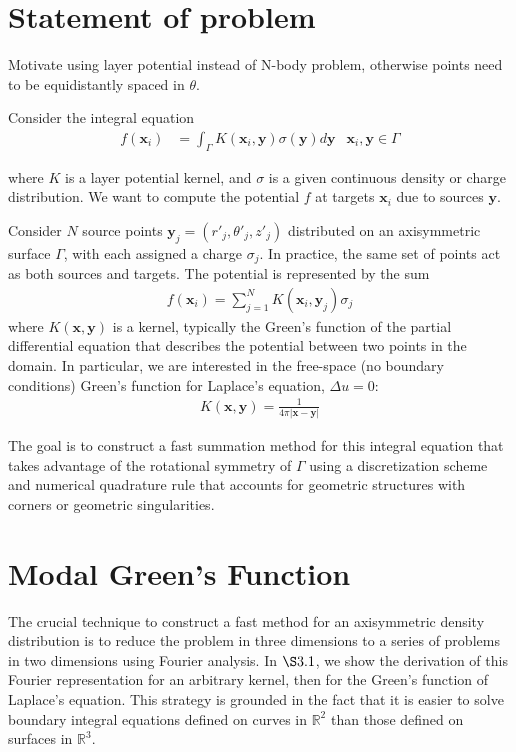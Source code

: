 \documentclass[11pt, oneside]{article}   	%
\begin{document}
\section{Statement of problem}
Motivate using layer potential instead of N-body problem, otherwise points need to be equidistantly spaced in $\theta$.

Consider the integral equation
\begin{align}
f(\mathbf{x}_i) &= \int_\Gamma K(\mathbf{x}_i,\mathbf{y})\sigma(\mathbf{y})d\mathbf{y} &\mathbf{x}_i,\mathbf{y}\in\Gamma
\end{align}

where $K$ is a layer potential kernel, and $\sigma$ is a given continuous density or charge distribution. We want to compute the potential $f$  at targets $\mathbf{x}_i$ due to sources $\mathbf{y}$.

Consider $N$ source points $\mathbf{y}_j=(r'_j,\theta'_j,z'_j)$ distributed on an axisymmetric surface $\Gamma$, with each assigned a charge $\sigma_j$. In practice, the same set of points act as both sources and targets. The potential is represented by the sum
\begin{align}
f(\mathbf{x}_i) = \sum_{j=1}^N K(\mathbf{x}_i,\mathbf{y}_j)\sigma_j
\end{align}
where $K(\mathbf{x},\mathbf{y})$ is a kernel, typically the Green's function of the partial differential equation that describes the potential between two points in the domain. In particular, we are interested in the free-space (no boundary conditions) Green's function for Laplace's equation, $\Delta u = 0$:
\begin{align}
K(\mathbf{x},\mathbf{y}) = \frac{1}{4\pi |\mathbf{x}-\mathbf{y}|}
\end{align}

The goal is to construct a fast summation method for this integral equation that takes advantage of the rotational symmetry of $\Gamma$ using a discretization scheme and numerical quadrature rule that accounts for geometric structures with corners or geometric singularities.

\section{Modal Green's Function}

The crucial technique to construct a fast method for an axisymmetric density distribution is to reduce the problem in three dimensions to a series of problems in two dimensions using Fourier analysis. In $\S3.1$, we show the derivation of this Fourier representation for an arbitrary kernel, then for the Green's function of Laplace's equation. This strategy is grounded in the fact that it is easier to solve boundary integral equations defined on curves in $\mathbb{R}^2$ than those defined on surfaces in $\mathbb{R}^3$.
\end{document}
